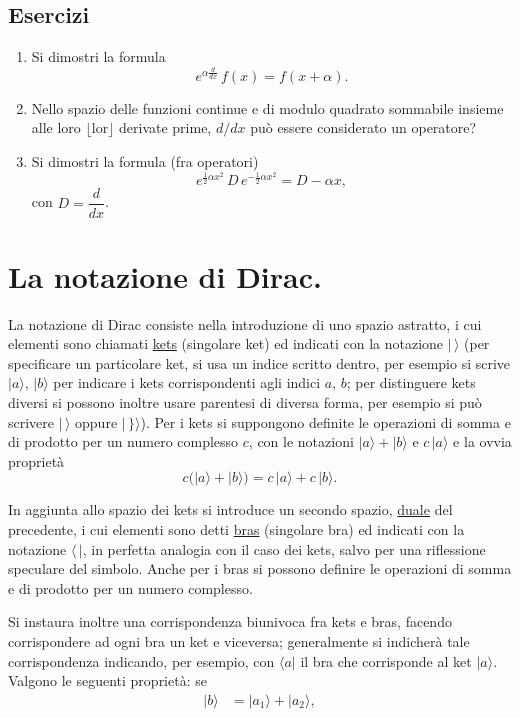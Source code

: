 \documentclass[11pt, a4paper]{book}
\numberwithin{equation}{section}
\newenvironment{esercizi}{\subsection*{Esercizi}\begin{enumerate}}{\end{enumerate}}
\begin{document}
\begin{esercizi}
\item[*] Si dimostri la formula
\[
e^{\alpha\frac{d}{dx}}\,f(x) = f(x+\alpha).
\]

\item Nello spazio delle funzioni continue e di modulo quadrato
sommabile insieme alle loro $\lfloor\text{lor}\rfloor$ derivate prime,
$d/dx$ può essere considerato un operatore?

\item Si dimostri la formula (fra operatori)
\[
e^{\frac{1}{2}\alpha x^2}\,D\,e^{-\frac{1}{2}\alpha x^2} = D - \alpha x,
\]
con $D = \dfrac{d}{dx}$.

\end{esercizi}

\section{La notazione di Dirac.}

La notazione di Dirac consiste nella introduzione di uno spazio
astratto, i cui elementi sono chiamati \uline{kets} (singolare ket)
ed indicati con la notazione $|\,\rangle$ (per specificare un particolare
ket, si usa un indice scritto dentro, per esempio si scrive $|a\rangle$,
$|b\rangle$ per indicare i kets corrispondenti agli indici $a$, $b$; per
distinguere kets diversi si possono inoltre usare parentesi di diversa
forma, per esempio si può scrivere $|\,\rangle$ oppure $|\,\}\rangle$).
Per i kets si suppongono definite le operazioni di somma e di prodotto
per un numero complesso $c$, con le notazioni $|a\rangle + |b\rangle$ e
$c\,|a\rangle$ e la ovvia proprietà
\begin{equation}
c\bigl(|a\rangle + |b\rangle\bigr) = c\,|a\rangle + c\,|b\rangle.
\end{equation}

In aggiunta allo spazio dei kets si introduce un secondo spazio,
\uline{duale} del precedente, i cui elementi sono detti
\uline{bras} (singolare bra) ed indicati con la notazione $\langle\,|$,
in perfetta analogia con il caso dei kets, salvo per una riflessione
speculare del simbolo. Anche per i bras si possono definire le operazioni
di somma e di prodotto per un numero complesso.

Si instaura inoltre una corrispondenza biunivoca fra kets e bras,
facendo corrispondere ad ogni bra un ket e viceversa; generalmente si
indicherà tale corrispondenza indicando, per esempio, con $\langle a|$
il bra che corrisponde al ket $|a\rangle$. Valgono le seguenti proprietà:
se
\begin{align}
|b\rangle &= |a_1\rangle + |a_2\rangle, \tag{2a}
\end{align}
\end{document}
